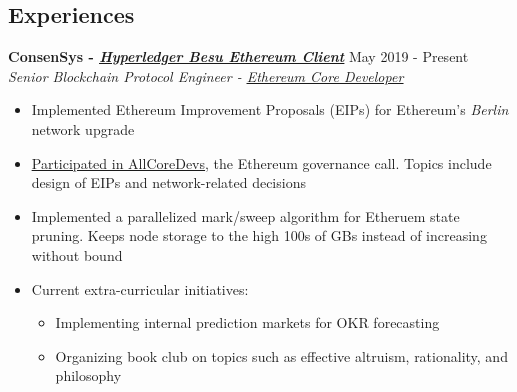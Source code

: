 \documentclass[overlapped]{res}
\begin{document}

\address{\href{rai.dev}{\underline{rai.dev}} \\ \href{https://www.github.com/ratanrsur}{\underline{github.com/ratanrsur}}}
\address{\href{mailto:ratan.r.sur@gmail.com}{\underline{ratan.r.sur@gmail.com}} \\ \hfill +1 646 410 6411\\\hfill{}US Citizen}
\begin{resume}


    \section{Experiences}

    {\bf ConsenSys - \href{https://www.github.com/Hyperledger/Besu}{\underline{\em Hyperledger Besu Ethereum Client}}} \hfill May 2019 - Present \\
    {\em Senior Blockchain Protocol Engineer - \href{https://hudsonjameson.com/2020-06-22-what-is-an-ethereum-core-developer}{{\underline{Ethereum Core Developer\/}}}}
  \begin{itemize} \itemsep-2pt
        \item Implemented Ethereum Improvement Proposals (EIPs) for Ethereum's {\em Berlin} network upgrade
        \item
          \href{https://youtu.be/AclPXsRlgSc?t=56}{\underline{Participated in AllCoreDevs}}, the Ethereum governance call. Topics include design of EIPs and network-related decisions
        \item
          Implemented a parallelized mark/sweep algorithm for Etheruem state pruning. Keeps node storage to the high 100s of GBs instead of increasing without bound
        \item Current extra-curricular initiatives:
        \begin{itemize} \itemsep-2pt
            \item Implementing internal prediction markets for OKR forecasting
            \item Organizing book club on topics such as effective altruism, rationality, and philosophy
        \end{itemize}
    \end{itemize}


\end{resume}
\end{document}
